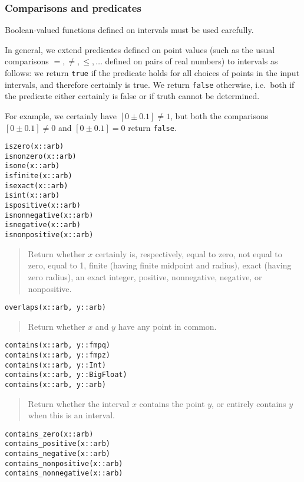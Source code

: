 \documentclass[a4paper,10pt]{article}
\newcommand{\desc}[1]{\vspace{-3mm}\begin{quote}#1\end{quote}}
\begin{document}
{{\subsubsection{Comparisons and predicates}

Boolean-valued functions defined on intervals must be used carefully.

In general, we extend predicates defined on point values (such as
the usual comparisons $=, \ne, \le, \ldots$ defined on pairs of real numbers)
to intervals as follows: we return
\texttt{true} if the predicate holds for all choices of points
in the input intervals, and therefore certainly is true.
We return \texttt{false} otherwise, i.e.\ both if the predicate
either certainly is false or if truth cannot be determined.

For example, we certainly have $[0 \pm 0.1] \ne 1$, but both the
comparisons $[0 \pm 0.1] \ne 0$ and $[0 \pm 0.1] = 0$
return \texttt{false}.

\begin{lstlisting}
iszero(x::arb)
isnonzero(x::arb)
isone(x::arb)
isfinite(x::arb)
isexact(x::arb)
isint(x::arb)
ispositive(x::arb)
isnonnegative(x::arb)
isnegative(x::arb)
isnonpositive(x::arb)
\end{lstlisting}

\desc{Return whether $x$ certainly is, respectively, equal to zero,
not equal to zero, equal to 1, finite (having finite midpoint and radius),
exact (having zero radius), an exact integer, positive, nonnegative,
negative, or nonpositive.}

\begin{lstlisting}
overlaps(x::arb, y::arb)
\end{lstlisting}

\desc{Return whether $x$ and $y$ have any point in common.}

\begin{lstlisting}
contains(x::arb, y::fmpq)
contains(x::arb, y::fmpz)
contains(x::arb, y::Int)
contains(x::arb, y::BigFloat)
contains(x::arb, y::arb)
\end{lstlisting}

\desc{Return whether the interval $x$ contains the point $y$,
or entirely contains $y$ when this is an interval.}

\begin{lstlisting}
contains_zero(x::arb)
contains_positive(x::arb)
contains_negative(x::arb)
contains_nonpositive(x::arb)
contains_nonnegative(x::arb)
\end{lstlisting}

}}
\end{document}
